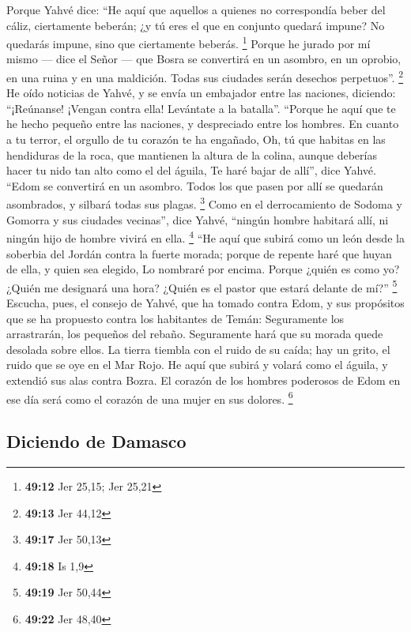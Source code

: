  Porque Yahvé dice: ``He aquí que aquellos a quienes no
correspondía beber del cáliz, ciertamente beberán; ¿y tú eres el que en
conjunto quedará impune? No quedarás impune, sino que ciertamente
beberás. \footnote{\textbf{49:12} Jer 25,15; Jer 25,21} 
Porque he jurado por mí mismo --- dice el Señor --- que Bosra se
convertirá en un asombro, en un oprobio, en una ruina y en una
maldición. Todas sus ciudades serán desechos perpetuos''. \footnote{\textbf{49:13}
  Jer 44,12}  He oído noticias de Yahvé, y se envía un
embajador entre las naciones, diciendo: ``¡Reúnanse! ¡Vengan contra
ella! Levántate a la batalla''.  ``Porque he aquí que te
he hecho pequeño entre las naciones, y despreciado entre los hombres.
 En cuanto a tu terror, el orgullo de tu corazón te ha
engañado, Oh, tú que habitas en las hendiduras de la roca, que mantienen
la altura de la colina, aunque deberías hacer tu nido tan alto como el
del águila, Te haré bajar de allí'', dice Yahvé.  ``Edom
se convertirá en un asombro. Todos los que pasen por allí se quedarán
asombrados, y silbará todas sus plagas. \footnote{\textbf{49:17} Jer
  50,13}  Como en el derrocamiento de Sodoma y Gomorra y
sus ciudades vecinas'', dice Yahvé, ``ningún hombre habitará allí, ni
ningún hijo de hombre vivirá en ella. \footnote{\textbf{49:18} Is 1,9}
 ``He aquí que subirá como un león desde la soberbia del
Jordán contra la fuerte morada; porque de repente haré que huyan de
ella, y quien sea elegido, Lo nombraré por encima. Porque ¿quién es como
yo? ¿Quién me designará una hora? ¿Quién es el pastor que estará delante
de mí?'' \footnote{\textbf{49:19} Jer 50,44}  Escucha,
pues, el consejo de Yahvé, que ha tomado contra Edom, y sus propósitos
que se ha propuesto contra los habitantes de Temán: Seguramente los
arrastrarán, los pequeños del rebaño. Seguramente hará que su morada
quede desolada sobre ellos.  La tierra tiembla con el
ruido de su caída; hay un grito, el ruido que se oye en el Mar Rojo.
 He aquí que subirá y volará como el águila, y extendió
sus alas contra Bozra. El corazón de los hombres poderosos de Edom en
ese día será como el corazón de una mujer en sus dolores. \footnote{\textbf{49:22}
  Jer 48,40}

\hypertarget{diciendo-de-damasco}{%
\subsection{Diciendo de Damasco}\label{diciendo-de-damasco}}

